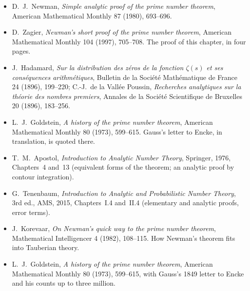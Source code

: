 \begin{itemize}
\item D.~J.~Newman, \emph{Simple analytic proof of the prime number theorem}, American Mathematical Monthly 87 (1980), 693--696.
\item D.~Zagier, \emph{Newman's short proof of the prime number theorem}, American Mathematical Monthly 104 (1997), 705--708. The proof of this chapter, in four pages.
\item J.~Hadamard, \emph{Sur la distribution des zéros de la fonction $\zeta(s)$ et ses conséquences arithmétiques}, Bulletin de la Société Mathématique de France 24 (1896), 199--220;
C.-J.~de la Vallée Poussin, \emph{Recherches analytiques sur la théorie des nombres premiers}, Annales de la Société Scientifique de Bruxelles 20 (1896), 183--256.
\item L.~J.~Goldstein, \emph{A history of the prime number theorem}, American Mathematical Monthly 80 (1973), 599--615. Gauss's letter to Encke, in translation, is quoted there.
\item T.~M.~Apostol, \emph{Introduction to Analytic Number Theory}, Springer, 1976, Chapters~4 and~13 (equivalent forms of the theorem; an analytic proof by contour integration).
\item G.~Tenenbaum, \emph{Introduction to Analytic and Probabilistic Number Theory}, 3rd ed., AMS, 2015, Chapters~I.4 and~II.4 (elementary and analytic proofs, error terms).
\item J.~Korevaar, \emph{On Newman's quick way to the prime number theorem}, Mathematical Intelligencer 4 (1982), 108--115. How Newman's theorem fits into Tauberian theory.
\item L.~J.~Goldstein, \emph{A history of the prime number theorem}, American Mathematical Monthly 80 (1973), 599--615, with Gauss's 1849 letter to Encke and his counts up to three million.
\end{itemize}
